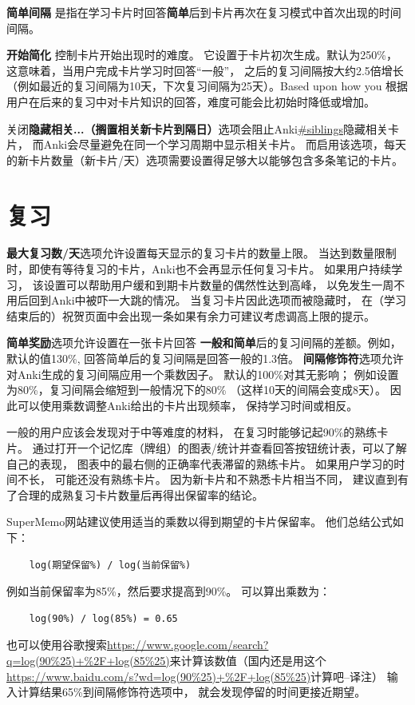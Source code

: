 \documentclass[a4paper]{book}
\begin{document}
\textbf{简单间隔} 是指在学习卡片时回答\textbf{简单}后到卡片再次在复习模式中首次出现的时间间隔。

\textbf{开始简化} 控制卡片开始出现时的难度。 它设置于卡片初次生成。默认为250\%， 这意味着，当用户完成卡片学习时回答“一般”， 之后的复习间隔按大约2.5倍增长 （例如最近的复习间隔为10天，下次复习间隔为25天）。Based upon how you 根据用户在后来的复习中对卡片知识的回答，难度可能会比初始时降低或增加。

关闭\textbf{隐藏相关...（搁置相关新卡片到隔日）}选项会阻止Anki\url{#siblings}隐藏相关卡片， 而Anki会尽量避免在同一个学习周期中显示相关卡片。 而启用该选项，每天的新卡片数量（新卡片/天）选项需要设置得足够大以能够包含多条笔记的卡片。

\section{复习}
\textbf{最大复习数/天}选项允许设置每天显示的复习卡片的数量上限。 当达到数量限制时，即使有等待复习的卡片，Anki也不会再显示任何复习卡片。 如果用户持续学习， 该设置可以帮助用户缓和到期卡片数量的偶然性达到高峰， 以免发生一周不用后回到Anki中被吓一大跳的情况。 当复习卡片因此选项而被隐藏时， 在（学习结束后的）祝贺页面中会出现一条如果有余力可建议考虑调高上限的提示。

\textbf{简单奖励}选项允许设置在一张卡片回答
\textbf{一般和简单}后的复习间隔的差额。例如，默认的值130\%, 回答简单后的复习间隔是回答一般的1.3倍。
\textbf{间隔修饰符}选项允许对Anki生成的复习间隔应用一个乘数因子。 默认的100\%对其无影响； 例如设置为80\%，复习间隔会缩短到一般情况下的80\% （这样10天的间隔会变成8天）。 因此可以使用乘数调整Anki给出的卡片出现频率， 保持学习时间或相反。

一般的用户应该会发现对于中等难度的材料， 在复习时能够记起90\%的熟练卡片。 通过打开一个记忆库（牌组）的图表/统计并查看回答按钮统计表，可以了解自己的表现， 图表中的最右侧的正确率代表滞留的熟练卡片。 如果用户学习的时间不长， 可能还没有熟练卡片。 因为新卡片和不熟悉卡片相当不同， 建议直到有了合理的成熟复习卡片数量后再得出保留率的结论。

SuperMemo网站建议使用适当的乘数以得到期望的卡片保留率。 他们总结公式如下：

\begin{shaded}\begin{verbatim}
	log(期望保留%) / log(当前保留%)
	\end{verbatim}\end{shaded}
例如当前保留率为85\%，然后要求提高到90\%。 可以算出乘数为：

\begin{shaded}\begin{verbatim}
	log(90%) / log(85%) = 0.65
	\end{verbatim}\end{shaded}
也可以使用谷歌搜索\url{https://www.google.com/search?q=log(90%25)+%2F+log(85%25)}来计算该数值（国内还是用这个\url{https://www.baidu.com/s?wd=log(90%25)+%2F+log(85%25)}计算吧--译注）
	输入计算结果65\%到间隔修饰符选项中， 就会发现停留的时间更接近期望。
	
\end{document}
